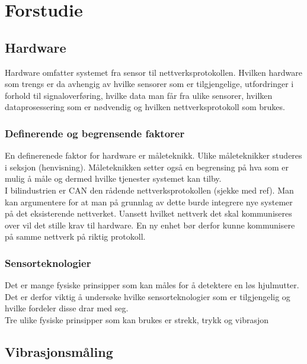 \chapter{Forstudie}

\section{Hardware}

Hardware omfatter systemet fra sensor til nettverksprotokollen. Hvilken hardware
som trengs er da avhengig av hvilke sensorer som er tilgjengelige, utfordringer
i forhold til signaloverføring, hvilke data
man får fra ulike sensorer, hvilken dataprosessering som er nødvendig og
hvilken nettverksprotokoll som brukes. \\

\subsection{Definerende og begrensende faktorer}

En definerenede faktor for hardware er måleteknikk. Ulike måleteknikker studeres
i seksjon (henvisning). Måleteknikken setter også en begrensing på hva som er
mulig å måle og dermed hvilke tjenester systemet kan tilby. \\

I bilindustrien er CAN den rådende nettverksprotokollen (sjekke med ref). Man
kan argumentere for at man på grunnlag av dette burde integrere nye systemer på
det eksisterende nettverket. Uansett hvilket nettverk det skal kommuniseres over
vil det stille krav til hardware. En ny enhet bør derfor kunne kommunisere på samme
nettverk på riktig protokoll. \\

\subsection{Sensorteknologier}

Det er mange fysiske prinsipper som kan måles for å detektere en løs hjulmutter.
Det er derfor viktig å undersøke hvilke sensorteknologier som er tilgjengelig og
hvilke fordeler disse drar med seg. \\

Tre ulike fysiske prinsipper som kan brukes er strekk, trykk og vibrasjon

\section{Vibrasjonsmåling}

